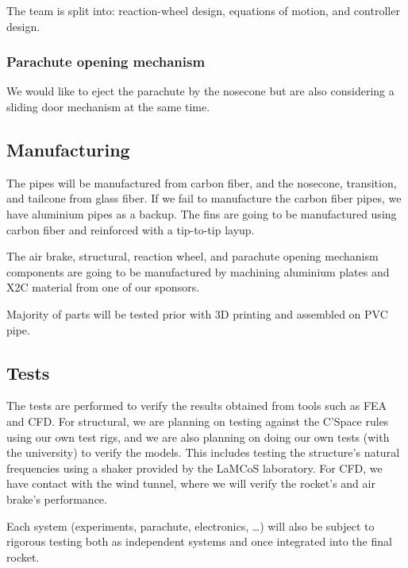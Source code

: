 The team is split into: reaction-wheel design, equations of motion, and controller design.

\subsubsection{Parachute opening mechanism}

We would like to eject the parachute by the nosecone but are also considering a sliding door mechanism at the same time.

\subsection{Manufacturing}
The pipes will be manufactured from carbon fiber, and the nosecone, transition, and tailcone from glass fiber. If we fail to manufacture the carbon fiber pipes, we have aluminium pipes as a backup.
The fins are going to be manufactured using carbon fiber and reinforced with a tip-to-tip layup.

The air brake, structural, reaction wheel, and parachute opening mechanism components are going to be manufactured by machining aluminium plates and X2C material from one of our sponsors.

Majority of parts will be tested prior with 3D printing and assembled on PVC pipe.
\subsection{Tests}
The tests are performed to verify the results obtained from tools such as FEA and CFD.
For structural, we are planning on testing against the C'Space rules using our own test rigs, and we are also planning on doing our own tests (with the university) to verify the models. This includes testing the structure's natural frequencies using a shaker provided by the LaMCoS laboratory.
For CFD, we have contact with the wind tunnel, where we will verify the rocket's and air brake's performance.

Each system (experiments, parachute, electronics, \dots) will also be subject to rigorous testing both as independent systems and once integrated into the final rocket.
